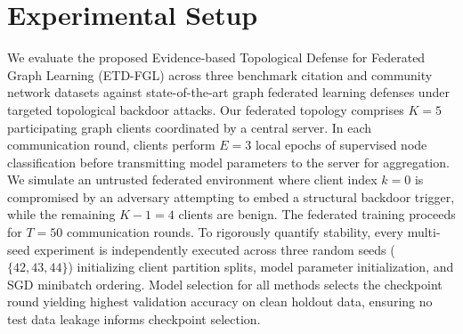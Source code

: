 \section{Experimental Setup}
\label{sec:experimental_setup}
We evaluate the proposed Evidence-based Topological Defense for Federated Graph Learning (\textsc{ETD-FGL}) across three benchmark citation and community network datasets against state-of-the-art graph federated learning defenses under targeted topological backdoor attacks.
Our federated topology comprises $K = 5$ participating graph clients coordinated by a central server.
In each communication round, clients perform $E = 3$ local epochs of supervised node classification before transmitting model parameters to the server for aggregation.
We simulate an untrusted federated environment where client index $k=0$ is compromised by an adversary attempting to embed a structural backdoor trigger, while the remaining $K-1 = 4$ clients are benign.
The federated training proceeds for $T = 50$ communication rounds.
To rigorously quantify stability, every multi-seed experiment is independently executed across three random seeds ($\{42, 43, 44\}$) initializing client partition splits, model parameter initialization, and SGD minibatch ordering.
Model selection for all methods selects the checkpoint round yielding highest validation accuracy on clean holdout data, ensuring no test data leakage informs checkpoint selection.
